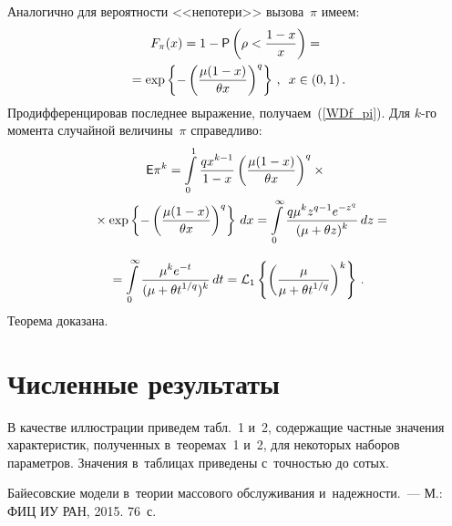 \begin{multicols}{2}



Аналогично для вероятности <<непотери>> вызова~$\pi$ имеем:
\begin{multline*}
F_\pi(x) = 1 - {\sf P}\left(\rho<\displaystyle\frac{\displaystyle 1-x\mathstrut}{\displaystyle x\mathstrut}\right)= {}\\
{}=
\exp\left\lbrace -\left(\displaystyle\frac{\displaystyle \mu(1-x)\mathstrut}{\displaystyle \theta x\mathstrut}\right)^q\right\rbrace \,,\enskip 
x\in(0,1)\,.
\end{multline*}
Продифференцировав последнее выражение, получаем~(\ref{WDf_pi}).
Для $k$-го момента случайной величины~$\pi$ справедливо:
\begin{multline*}
{\sf E}\pi^k = \int\limits_0^{1}\displaystyle\frac{\displaystyle qx^{k-1}\mathstrut}{\displaystyle 1-x\mathstrut}\left(
\displaystyle\frac{\displaystyle \mu(1-x)\mathstrut}{\displaystyle \theta x\mathstrut}\right)^q \times{}\\
{}\times\exp\left\lbrace -\left(
\displaystyle\frac{\displaystyle \mu(1-x)\mathstrut}{\displaystyle \theta x\mathstrut}\right)^q\right\rbrace \,dx = \int\limits_0^{\infty}
\displaystyle\frac{\displaystyle q\mu^k z^{q-1} e^{-z^q}\mathstrut}{\displaystyle (\mu + \theta z)^k\mathstrut}\, dz={}\hspace*{-9pt}
\end{multline*}

\noindent
\begin{multline*}
{}=
 \int\limits_0^{\infty}
 \displaystyle\frac{\displaystyle \mu^k e^{-t}\mathstrut}{\displaystyle (\mu+\theta t^{1/q} )^k\mathstrut}\,dt = 
 \mathcal{L}_1\left\lbrace\left(
 \displaystyle\frac{\displaystyle \mu\mathstrut}{\displaystyle \mu+\theta t^{1/q}\mathstrut}\right)^k\right\rbrace\,.
 \end{multline*}
Теорема доказана.

\section{Численные результаты}

 В качестве иллюстрации приведем табл.~1 и~2, содержащие частные значения характеристик, 
 полученных в~теоремах~1 и~2, для некоторых наборов параметров. Значения в~таблицах 
 приведены с~точностью до сотых.

{\small\frenchspacing
 {%
 \begin{thebibliography}{9}
 

Байесовские модели в~тео\-рии массового обслуживания и~надежности.~--- 
М.: ФИЦ ИУ РАН, 2015. 76~с.
\end{thebibliography}

 }
 }

\end{multicols}

\vspace*{-6pt}

